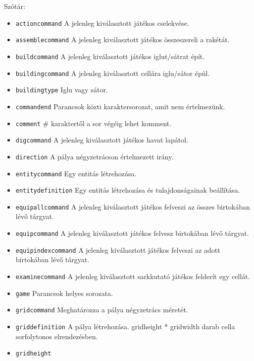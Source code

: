 Szótár:

\begin{itemize}
\item \texttt{action\textunderscore{}command}
A jelenleg kiválasztott játékos cselekvése.
\item \texttt{assemble\textunderscore{}command}
A jelenleg kiválasztott játékos összeszereli a rakétát.
\item \texttt{build\textunderscore{}command}
A jelenleg kiválasztott játékos iglut/sátrat épít.
\item \texttt{building\textunderscore{}command}
A jelenleg kiválasztott cellára iglu/sátor épül.
\item \texttt{building\textunderscore{}type}
Iglu vagy sátor.
\item \texttt{command\textunderscore{}end}
Parancsok közti karaktersorozat, amit nem értelmezünk.
\item \texttt{comment}
\# karaktertől a sor végéig lehet komment.
\item \texttt{dig\textunderscore{}command}
A jelenleg kiválasztott játékos havat lapátol.
\item \texttt{direction}
A pálya négyzetrácson értelmezett irány.
\item \texttt{entity\textunderscore{}command}
Egy entitás létrehozása.
\item \texttt{entity\textunderscore{}definition}
Egy entitás létrehozása és tulajdonságainak beállítása.
\item \texttt{equip\textunderscore{}all\textunderscore{}command}
A jelenleg kiválasztott játékos felveszi az összes birtokában lévő tárgyat.
\item \texttt{equip\textunderscore{}command}
A jelenleg kiválasztott játékos felvesz birtokában lévő tárgyat.
\item \texttt{equip\textunderscore{}index\textunderscore{}command}
A jelenleg kiválasztott játékos felveszi az adott birtokában lévő tárgyat.
\item \texttt{examine\textunderscore{}command}
A jelenleg kiválasztott sarkkutató játékos felderít egy cellát.
\item \texttt{game}
Parancsok helyes sorozata.
\item \texttt{grid\textunderscore{}command}
Meghatározza a pálya négyzetrács méretét.
\item \texttt{grid\textunderscore{}definition}
A pálya létrehozása. grid\textunderscore{}height * grid\textunderscore{}width darab cella sorfolytonos elrendezésben.
\item \texttt{grid\textunderscore{}height}

\end{itemize}
